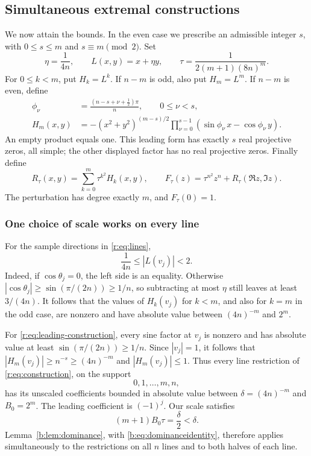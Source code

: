 \documentclass[UTF8,11pt]{ctexart}
\theoremstyle{definition}
\numberwithin{equation}{section}
\begin{document}
\subsection{Simultaneous extremal constructions}\label{r:sec:construction}

We now attain the bounds. In the even case we prescribe an admissible
integer $s$, with $0\le s\le m$ and $s\equiv m\pmod2$. Set
\[
 \eta=\frac1{4n},\qquad L(x,y)=x+\eta y,\qquad
 \tau=\frac{1}{2(m+1)(8n)^m}.
\]
For $0\le k<m$, put $H_k=L^k$. If $n-m$ is odd, also put $H_m=L^m$.
If $n-m$ is even, define
\begin{equation}\label{r:eq:leading-construction}
 \begin{split}
 \phi_\nu&=\frac{(n-s+\nu+\tfrac12)\pi}{n},\qquad 0\le\nu<s,\\
 H_m(x,y)&=-(x^2+y^2)^{(m-s)/2}
 \prod_{\nu=0}^{s-1}(\sin\phi_\nu\,x-\cos\phi_\nu\,y).
 \end{split}
\end{equation}
An empty product equals one. This leading form has exactly $s$ real
projective zeros, all simple; the other displayed factor has no real
projective zeros. Finally define
\begin{equation}\label{r:eq:construction}
 R_\tau(x,y)=\sum_{k=0}^m\tau^{k^2}H_k(x,y),\qquad
 F_\tau(z)=\tau^{n^2}z^n+R_\tau(\Re z,\Im z).
\end{equation}
The perturbation has degree exactly $m$, and $F_\tau(0)=1$.

\subsubsection{One choice of scale works on every line}
For the sample directions in \eqref{r:eq:lines},
\[
 \frac1{4n}\le |L(v_j)|<2.
\]
Indeed, if $\cos\theta_j=0$, the left side is an equality. Otherwise
$|\cos\theta_j|\ge\sin(\pi/(2n))\ge1/n$, so subtracting at most
$\eta$ still leaves at least $3/(4n)$. It follows that the values of
$H_k(v_j)$ for $k<m$, and also for $k=m$ in the odd case, are nonzero
and have absolute value between $(4n)^{-m}$ and $2^m$.

For \eqref{r:eq:leading-construction}, every sine factor at $v_j$ is
nonzero and has absolute value at least $\sin(\pi/(2n))\ge1/n$.
Since $|v_j|=1$, it follows that
$|H_m(v_j)|\ge n^{-s}\ge(4n)^{-m}$ and $|H_m(v_j)|\le1$.
Thus every line restriction of \eqref{r:eq:construction}, on the support
\[
 0,1,\ldots,m,n,
\]
has its unscaled coefficients bounded in absolute value between
$\delta=(4n)^{-m}$ and $B_0=2^m$. The leading coefficient is $(-1)^j$.
Our scale satisfies
\[
 (m+1)B_0\tau=\frac\delta2<\delta.
\]
Lemma~\ref{b:lem:dominance}, with \eqref{b:eq:dominanceidentity}, therefore applies
simultaneously to the restrictions on all $n$ lines and to both
halves of each line.
\end{document}
